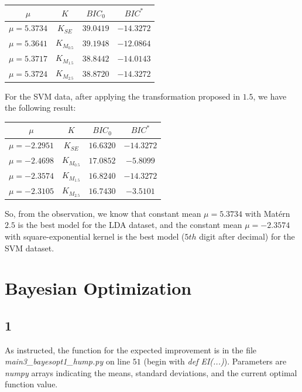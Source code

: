 \documentclass[12pt,a4paper]{article}
\begin{document}
\begin{center}
\begin{tabular}{|c|c|c|c|}
\hline
$\mu$ & $K$ & $BIC_0$ & $BIC^*$ \\ 
\hline
\hline
$\mu=5.3734$ & $K_{SE}$ & $39.0419$ & $-14.3272$ \\ 
\hline
$\mu=5.3641$ & $K_{M_{0.5}}$ & $39.1948$ & $-12.0864$ \\ 
\hline
$\mu=5.3717$ & $K_{M_{1.5}}$ & $38.8442$ & $-14.0143$ \\ 
\hline
$\mu=5.3724$ & $K_{M_{2.5}}$ & $38.8720$ & $-14.3272$ \\ 
\hline
\end{tabular}
\end{center}

For the SVM data, after applying the transformation proposed in $1.5$, we have the following result:

\begin{center}
\begin{tabular}{|c|c|c|c|}
\hline
$\mu$ & $K$ & $BIC_0$ & $BIC^*$ \\ 
\hline
\hline
$\mu=-2.2951$ & $K_{SE}$ & $16.6320$ & $-14.3272$ \\ 
\hline
$\mu=-2.4698$ & $K_{M_{0.5}}$ & $17.0852$ & $-5.8099$ \\ 
\hline
$\mu=-2.3574$ & $K_{M_{1.5}}$ & $16.8240$ & $-14.3272$ \\ 
\hline
$\mu=-2.3105$ & $K_{M_{2.5}}$ & $16.7430$ & $-3.5101$ \\ 
\hline
\end{tabular}
\end{center}

So, from the observation, we know that constant mean $\mu=5.3734$ with  Matérn $2.5$ is the best model for the LDA dataset, and the constant mean $\mu=-2.3574$ with square-exponential kernel is the best model ($5th$ digit after decimal) for the SVM dataset.

\newpage

\section{Bayesian Optimization}

\subsection*{1}
As instructed, the function for the expected improvement is in the file \textit{main3\_bayesopt1\_hump.py} on line $51$ (begin with \textit{def EI(...)}). Parameters are \textit{numpy} arrays indicating the means, standard deviations, and the current optimal function value.
\end{document}
